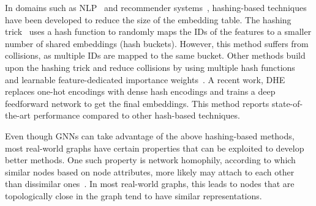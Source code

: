 \documentclass[conference]{IEEEtran}
\begin{document}
In domains such as NLP~\cite{weinberger2009feature, svenstrup2017hash} and recommender systems~\cite{kang2020deep,serra2017getting,zhang2020model}, hashing-based techniques have been developed to reduce the size of the embedding table.
The hashing trick~\cite{weinberger2009feature} uses a hash function to randomly maps the IDs of the features to a smaller number of shared embeddings (hash buckets). However, this method suffers from collisions, as multiple IDs are mapped to the same bucket. 
Other methods build upon the hashing trick and reduce collisions by using multiple hash functions~\cite{serra2017getting, zhang2020model} and learnable feature-dedicated importance weights~\cite{svenstrup2017hash}. A recent work, DHE~\cite{kang2020deep} replaces one-hot encodings with dense hash encodings and trains a deep feedforward network to get the final embeddings. This method reports state-of-the-art performance compared to other hash-based techniques.

Even though GNNs can take advantage of the above hashing-based methods, most real-world graphs have certain properties that can be exploited to develop better methods. 
One such property is network homophily, according to which similar nodes based on node attributes, more likely may attach to each other than dissimilar ones~\cite{mcpherson2001birds}. In most real-world graphs, this leads to nodes that are topologically close in the graph tend to have similar representations.
% 
\end{document}
